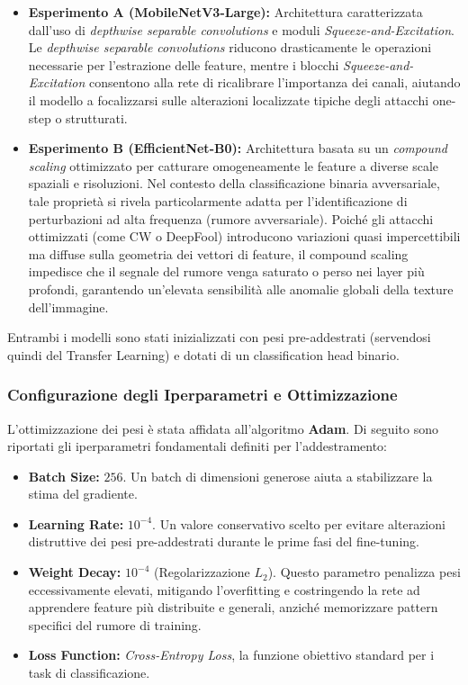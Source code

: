 \documentclass[a4paper, 12pt]{article}
\begin{document}
\begin{itemize}
    \item \textbf{Esperimento A (MobileNetV3-Large):} Architettura caratterizzata dall'uso di \textit{depthwise separable convolutions} e moduli \textit{Squeeze-and-Excitation}. 
    Le \textit{depthwise separable convolutions} riducono drasticamente le operazioni necessarie per 
    l'estrazione delle feature, mentre i blocchi \textit{Squeeze-and-Excitation} consentono alla rete di ricalibrare 
    l'importanza dei canali, aiutando il modello a focalizzarsi sulle alterazioni localizzate tipiche degli attacchi 
    one-step o strutturati.

    \item \textbf{Esperimento B (EfficientNet-B0):} Architettura basata su un \textit{compound scaling} ottimizzato per  
    catturare omogeneamente le feature a diverse scale spaziali e 
    risoluzioni. Nel contesto della classificazione binaria avversariale, tale proprietà si rivela particolarmente adatta per 
    l'identificazione di perturbazioni ad alta frequenza (rumore avversariale). Poiché gli attacchi ottimizzati (come CW o 
    DeepFool) introducono variazioni quasi impercettibili ma diffuse sulla geometria dei vettori di feature, 
    il compound scaling impedisce che il segnale del rumore venga saturato o perso nei layer più profondi, garantendo 
    un'elevata sensibilità alle anomalie globali della texture dell'immagine.
\end{itemize}
Entrambi i modelli sono stati inizializzati con pesi pre-addestrati (servendosi quindi del Transfer Learning) e 
dotati di un classification head binario.

\vspace{10pt} 

\subsubsection{Configurazione degli Iperparametri e Ottimizzazione}
L'ottimizzazione dei pesi è stata affidata all'algoritmo \textbf{Adam}. Di seguito sono riportati gli iperparametri 
fondamentali definiti  per l'addestramento:
\begin{itemize}
    \item \textbf{Batch Size:} $256$. Un batch di dimensioni generose aiuta a stabilizzare la stima del gradiente.
    \item \textbf{Learning Rate:}  $10^{-4}$. Un valore conservativo scelto per evitare alterazioni 
    distruttive dei pesi pre-addestrati durante le prime fasi del fine-tuning.
    \item \textbf{Weight Decay:} $10^{-4}$ (Regolarizzazione $L_2$). Questo parametro penalizza pesi 
    eccessivamente elevati, mitigando l'overfitting e costringendo la rete ad apprendere feature più distribuite e 
    generali, anziché memorizzare pattern specifici del rumore di training.
    \item \textbf{Loss Function:} \textit{Cross-Entropy Loss}, la funzione obiettivo standard per i task di 
    classificazione.
\end{itemize}
\end{document}
